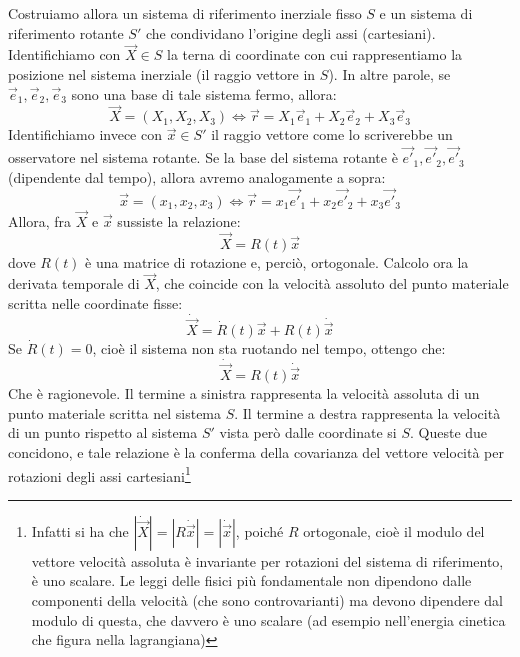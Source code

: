 \documentclass[a4paper,openany]{article}
\begin{document}
	Costruiamo allora un sistema di riferimento inerziale fisso $S$ e un sistema di riferimento rotante $S'$ che condividano l'origine degli assi (cartesiani). Identifichiamo con $\vec{X}\in S$ la terna di coordinate con cui rappresentiamo la posizione nel sistema inerziale (il raggio vettore in $S$). In altre parole, se $\vec{e}_{1},\vec{e}_{2},\vec{e}_{3}$ sono una base di tale sistema fermo, allora:
	$$
	\vec{X} = (X_1,X_2,X_3) \iff \vec{r} = X_1
	\vec{e}_1 + X_2
	\vec{e}_2 +X_3 \vec{e}_3$$
	Identifichiamo invece con $\vec{x}\in S'$ il raggio vettore come lo scriverebbe un osservatore nel sistema rotante. Se la base del sistema rotante è $\vec{e'}_{1},\vec{e'}_{2},\vec{e'}_{3}$ (dipendente dal tempo), allora avremo analogamente a sopra:
	$$
	\vec{x} = (x_1,x_2,x_3) \iff \vec{r} = x_1
	\vec{e'}_1 + x_2
	\vec{e'}_2 +x_3 \vec{e'}_3
	$$
	Allora, fra $\vec{X}$ e $\vec{x}$ sussiste la relazione:
	$$
	\vec{X} = R(t)\vec{x}
	$$
	dove $R(t)$ è una matrice di rotazione e, perciò, ortogonale. Calcolo ora la derivata temporale di $\vec{X}$, che coincide con la velocità assoluto del punto materiale scritta nelle coordinate fisse:
	$$
	\dot{\vec{X}} = \dot{R}(t)\vec{x} + R(t)\dot{\vec{x}}
	$$
	Se $\dot{R}(t) = 0$, cioè il sistema non sta ruotando nel tempo, ottengo che:
	$$
	\dot{\vec{X}} = R(t)\dot{\vec{x}}
	$$
	Che è ragionevole. Il termine a sinistra rappresenta la velocità assoluta di un punto materiale scritta nel sistema $S$. Il termine a destra rappresenta la velocità di un punto rispetto al sistema $S'$ vista però dalle coordinate si $S$. Queste due concidono, e tale relazione è la conferma della covarianza del vettore velocità per rotazioni degli assi cartesiani\footnote{Infatti si ha che $|\dot{\vec{X}}| = |R\dot{\vec{x}}| = |\dot{\vec{x}}|$, poiché $R$ ortogonale, cioè il modulo del vettore velocità assoluta è invariante per rotazioni del sistema di riferimento, è uno scalare. Le leggi delle fisici più fondamentale non dipendono dalle componenti della velocità (che sono controvarianti) ma devono dipendere dal modulo di questa, che davvero è uno scalare (ad esempio nell'energia cinetica che figura nella lagrangiana)}
	
\end{document}
